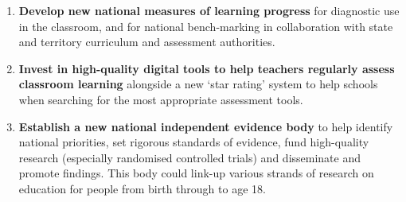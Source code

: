 \begin{recommendations}
\begin{enumerate}
    \item \textbf{Develop new national measures of learning progress} for diagnostic use in the classroom, and for national bench-marking in collaboration with state and territory curriculum and assessment authorities.
    
    \item \textbf{Invest in high-quality digital tools to help teachers regularly assess classroom learning} alongside a new `star rating' system to help schools when searching for the most appropriate assessment tools.
    
    \item \textbf{Establish a new national independent evidence body} to help identify national priorities, set rigorous standards of evidence, fund high-quality research (especially randomised controlled trials) and disseminate and promote findings. This body could link-up various strands of research on education for people from birth through to age 18.
    
   \end{enumerate}
   

\end{recommendations}


    
   






